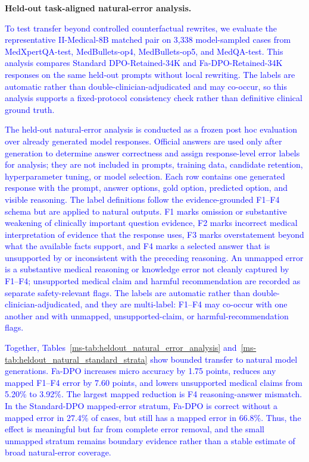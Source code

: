 \documentclass[12pt]{article}
\newcommand{\added}[1]{\textcolor{blue}{#1}}
\begin{document}
\textbf{Held-out task-aligned natural-error analysis.}
\begin{displayquote}
\added{To test transfer beyond controlled counterfactual rewrites, we evaluate the representative II-Medical-8B matched pair on 3,338 model-sampled cases from MedXpertQA-test, MedBullets-op4, MedBullets-op5, and MedQA-test. This analysis compares Standard DPO-Retained-34K and Fa-DPO-Retained-34K responses on the same held-out prompts without local rewriting. The labels are automatic rather than double-clinician-adjudicated and may co-occur, so this analysis supports a fixed-protocol consistency check rather than definitive clinical ground truth.}

\added{The held-out natural-error analysis is conducted as a frozen post hoc evaluation over already generated model responses. Official answers are used only after generation to determine answer correctness and assign response-level error labels for analysis; they are not included in prompts, training data, candidate retention, hyperparameter tuning, or model selection. Each row contains one generated response with the prompt, answer options, gold option, predicted option, and visible reasoning. The label definitions follow the evidence-grounded F1--F4 schema but are applied to natural outputs. F1 marks omission or substantive weakening of clinically important question evidence, F2 marks incorrect medical interpretation of evidence that the response uses, F3 marks overstatement beyond what the available facts support, and F4 marks a selected answer that is unsupported by or inconsistent with the preceding reasoning. An unmapped error is a substantive medical reasoning or knowledge error not cleanly captured by F1--F4; unsupported medical claim and harmful recommendation are recorded as separate safety-relevant flags. The labels are automatic rather than double-clinician-adjudicated, and they are multi-label: F1--F4 may co-occur with one another and with unmapped, unsupported-claim, or harmful-recommendation flags.}

\added{Together, Tables~\ref*{ms-tab:heldout_natural_error_analysis} and~\ref*{ms-tab:heldout_natural_standard_strata} show bounded transfer to natural model generations. Fa-DPO increases micro accuracy by 1.75 points, reduces any mapped F1--F4 error by 7.60 points, and lowers unsupported medical claims from 5.20\% to 3.92\%. The largest mapped reduction is F4 reasoning-answer mismatch. In the Standard-DPO mapped-error stratum, Fa-DPO is correct without a mapped error in 27.4\% of cases, but still has a mapped error in 66.8\%. Thus, the effect is meaningful but far from complete error removal, and the small unmapped stratum remains boundary evidence rather than a stable estimate of broad natural-error coverage.}
\end{displayquote}
\end{document}
